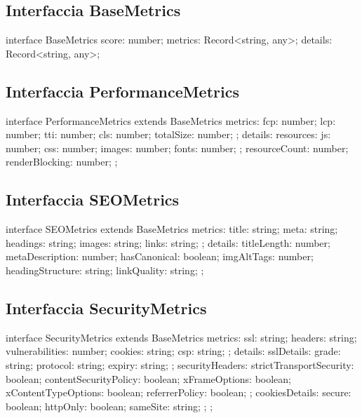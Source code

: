 {{{{{{{\subsection{Interfaccia BaseMetrics}
\begin{asciiart}
interface BaseMetrics {
  score: number;
  metrics: Record<string, any>;
  details: Record<string, any>;
}
\end{asciiart}

\subsection{Interfaccia PerformanceMetrics}
\begin{asciiart}
interface PerformanceMetrics extends BaseMetrics {
  metrics: {
    fcp: number;
    lcp: number;
    tti: number;
    cls: number;
    totalSize: number;
  };
  details: {
    resources: {
      js: number;
      css: number;
      images: number;
      fonts: number;
    };
    resourceCount: number;
    renderBlocking: number;
  };
}
\end{asciiart}

\subsection{Interfaccia SEOMetrics}
\begin{asciiart}
interface SEOMetrics extends BaseMetrics {
  metrics: {
    title: string;
    meta: string;
    headings: string;
    images: string;
    links: string;
  };
  details: {
    titleLength: number;
    metaDescription: number;
    hasCanonical: boolean;
    imgAltTags: number;
    headingStructure: string;
    linkQuality: string;
  };
}
\end{asciiart}

\subsection{Interfaccia SecurityMetrics}
\begin{asciiart}
interface SecurityMetrics extends BaseMetrics {
  metrics: {
    ssl: string;
    headers: string;
    vulnerabilities: number;
    cookies: string;
    csp: string;
  };
  details: {
    sslDetails: {
      grade: string;
      protocol: string;
      expiry: string;
    };
    securityHeaders: {
      strictTransportSecurity: boolean;
      contentSecurityPolicy: boolean;
      xFrameOptions: boolean;
      xContentTypeOptions: boolean;
      referrerPolicy: boolean;
    };
    cookiesDetails: {
      secure: boolean;
      httpOnly: boolean;
      sameSite: string;
    };
  };
}
\end{asciiart}

}}}}}}}
